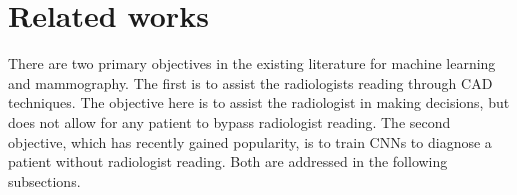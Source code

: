 \documentclass[journal]{IEEEtran}
\begin{document}



%
\appendices


\section{\label{Appendix:related}Related works}

There are two primary objectives in the existing literature for machine learning and mammography.  The first is to assist the radiologists reading through CAD techniques.  The objective here is to assist the radiologist in making decisions, but does not allow for any patient to bypass radiologist reading.  The second objective, which has recently gained popularity, is to train CNNs to diagnose a patient without radiologist reading.  Both are addressed in the following subsections.  
\end{document}

